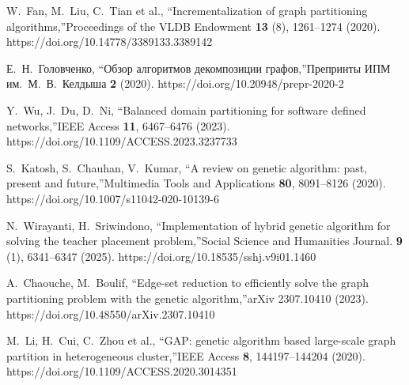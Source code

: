 \documentclass[
11pt,%
tightenlines,%
twoside,%
onecolumn,%
nofloats,%
nobibnotes,%
nofootinbib,%
superscriptaddress,%
noshowpacs,%
centertags]%
{revtex4}
\begin{document}
\begin{thebibliography}{99}
W.~Fan, M.~Liu, C.~Tian et al., \textquotedblleft Incrementalization of graph partitioning algorithms,\textquotedblright Proceedings of the VLDB Endowment \textbf{13} (8), 1261--1274 (2020). https://doi.org/10.14778/3389133.3389142

Е.~Н.~Головченко, \textquotedblleft Обзор алгоритмов декомпозиции графов,\textquotedblright Препринты ИПМ им.~М.~В.~Келдыша \textbf{2} (2020). https://doi.org/10.20948/prepr-2020-2

Y.~Wu, J.~Du, D.~Ni, \textquotedblleft Balanced domain partitioning for software defined networks,\textquotedblright IEEE Access \textbf{11}, 6467--6476 (2023). https://doi.org/10.1109/ACCESS.2023.3237733

S.~Katosh, S.~Chauhan, V.~Kumar, \textquotedblleft A review on genetic algorithm: past, present and future,\textquotedblright Multimedia Tools and Applications \textbf{80}, 8091--8126 (2020). https://doi.org/10.1007/s11042-020-10139-6

N.~Wirayanti, H.~Sriwindono, \textquotedblleft Implementation of hybrid genetic algorithm for solving the teacher placement problem,\textquotedblright Social Science and Humanities Journal. \textbf{9} (1), 6341--6347 (2025). https://doi.org/10.18535/sshj.v9i01.1460

A.~Chaouche, M.~Boulif, \textquotedblleft Edge-set reduction to efficiently solve the graph partitioning problem with the genetic algorithm,\textquotedblright arXiv 2307.10410 (2023). https://doi.org/10.48550/arXiv.2307.10410

M.~Li, H.~Cui, C.~Zhou et al., \textquotedblleft GAP: genetic algorithm based large-scale graph partition in heterogeneous cluster,\textquotedblright IEEE Access \textbf{8}, 144197--144204 (2020). https://doi.org/10.1109/ACCESS.2020.3014351

\end{thebibliography}
\end{document}
